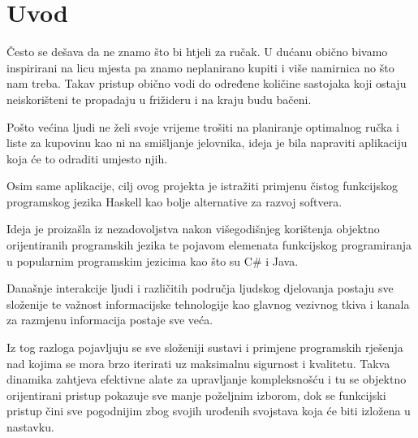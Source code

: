 \chapter{Uvod}

Često se dešava da ne znamo što bi htjeli za ručak. U dućanu obično bivamo inspirirani na licu mjesta pa znamo neplanirano kupiti i više namirnica no što nam treba. Takav pristup obično vodi do određene količine sastojaka koji ostaju neiskorišteni te propadaju u frižideru i na kraju budu bačeni.

Pošto većina ljudi ne želi svoje vrijeme trošiti na planiranje optimalnog ručka i liste za kupovinu kao ni na smišljanje jelovnika, ideja je bila napraviti aplikaciju koja će to odraditi umjesto njih.

Osim same aplikacije, cilj ovog projekta je istražiti primjenu čistog funkcijskog programskog jezika Haskell kao bolje alternative za razvoj softvera.

Ideja je proizašla iz nezadovoljstva nakon višegodišnjeg korištenja objektno orijentiranih programskih jezika te pojavom elemenata funkcijskog programiranja u popularnim programskim jezicima kao što su C\# i Java.

Današnje interakcije ljudi i različitih područja ljudskog djelovanja postaju sve složenije te važnost informacijske tehnologije kao glavnog vezivnog tkiva i kanala za razmjenu informacija postaje sve veća.

Iz tog razloga pojavljuju se sve složeniji sustavi i primjene programskih rješenja nad kojima se mora brzo iterirati uz maksimalnu sigurnost i kvalitetu. Takva dinamika zahtjeva efektivne alate za upravljanje kompleksnošću i tu se objektno orijentirani pristup pokazuje sve manje poželjnim izborom, dok se funkcijski pristup čini sve pogodnijim zbog svojih urođenih svojstava koja će biti izložena u nastavku.




